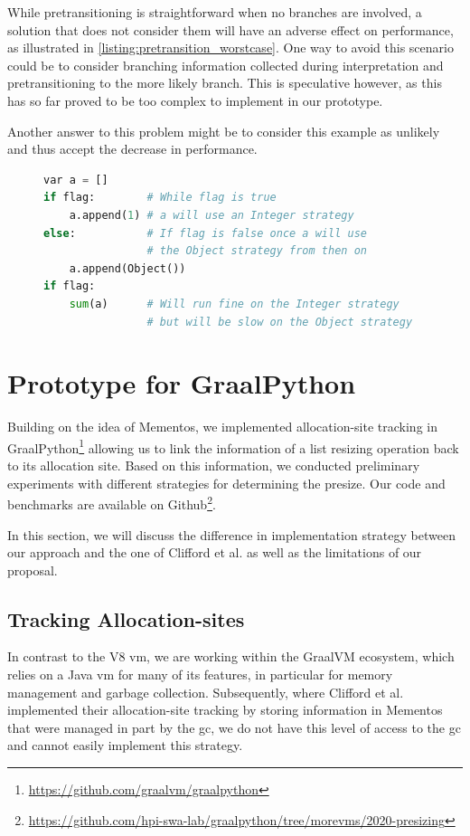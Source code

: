 \documentclass[sigconf, review, balance=false]{acmart}
\newcommand{\ac}[1]{\gls*{#1}}
\begin{document}
While pretransitioning is straightforward when no branches are
involved, a solution that does not consider them will have an
adverse effect on performance, as illustrated in
\autoref{listing:pretransition_worstcase}. One way to avoid this
scenario could be to consider branching information collected during
interpretation and pretransitioning to the more likely branch. This is
speculative however, as this has so far proved to be too complex to
implement in our prototype.

Another answer to this problem might be to consider this example as
unlikely and thus accept the decrease in performance.



\begin{figure}
\begin{lstlisting}[language=Python,label={listing:pretransition_worstcase},
  caption={Example of pretransitioning adversely affecting performance
    due to branching}]
var a = []
if flag:        # While flag is true    
    a.append(1) # a will use an Integer strategy
else:           # If flag is false once a will use
                # the Object strategy from then on
    a.append(Object())
if flag:
    sum(a)      # Will run fine on the Integer strategy
                # but will be slow on the Object strategy
\end{lstlisting}   
\end{figure}


\section{Prototype for GraalPython}
\label{sec:prototype}
Building on the idea of Mementos, we implemented allocation-site
tracking in
GraalPython\footnote{\url{https://github.com/graalvm/graalpython}} allowing
us to link the information of a list resizing operation back to its
allocation site. Based on this information, we conducted preliminary
experiments with different strategies for determining the presize. Our
code and benchmarks are available on
Github\footnote{\url{https://github.com/hpi-swa-lab/graalpython/tree/morevms/2020-presizing}}.

In this section, we will discuss the difference in implementation
strategy between our approach and the one of Clifford et al. as well as the
limitations of our proposal.

\subsection*{Tracking Allocation-sites}
\label{sec:implementation}
In contrast to the V8 \ac{vm}, we are working within the GraalVM
ecosystem, which relies on a Java \ac{vm} for many of its features, in
particular for memory management and garbage collection. Subsequently,
where Clifford et al. implemented their allocation-site tracking by
storing information in Mementos that were managed in part by the
\ac{gc}, we do not have this level of access to the \ac{gc} and cannot
easily implement this strategy.
\end{document}

